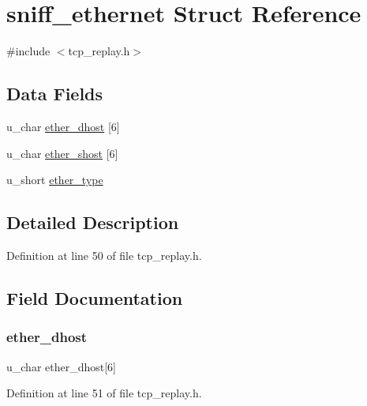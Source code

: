 \hypertarget{structsniff__ethernet}{}\section{sniff\+\_\+ethernet Struct Reference}
\label{structsniff__ethernet}


{\ttfamily \#include $<$tcp\+\_\+replay.\+h$>$}

\subsection*{Data Fields}
\begin{DoxyCompactItemize}
\item 
u\+\_\+char \hyperlink{structsniff__ethernet_aa0ee751e703ccacc698208d9b345afc7}{ether\+\_\+dhost} \mbox{[}6\mbox{]}
\item 
u\+\_\+char \hyperlink{structsniff__ethernet_a8ca4d06502ca0f15b6458344d58c4325}{ether\+\_\+shost} \mbox{[}6\mbox{]}
\item 
u\+\_\+short \hyperlink{structsniff__ethernet_ab36efdcd906c499f7348cfe71081a17f}{ether\+\_\+type}
\end{DoxyCompactItemize}


\subsection{Detailed Description}


Definition at line 50 of file tcp\+\_\+replay.\+h.



\subsection{Field Documentation}
\mbox{\label{structsniff__ethernet_aa0ee751e703ccacc698208d9b345afc7}} 
\subsubsection{\texorpdfstring{ether\+\_\+dhost}{ether\_dhost}}
{\footnotesize\ttfamily u\+\_\+char ether\+\_\+dhost\mbox{[}6\mbox{]}}



Definition at line 51 of file tcp\+\_\+replay.\+h.

